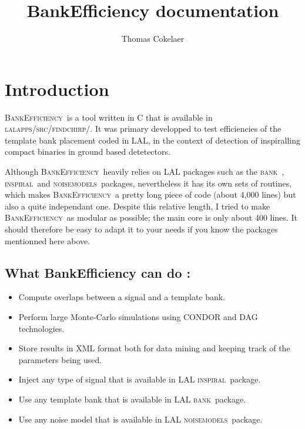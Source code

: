 \documentclass[a4paper,10pt]{article}
\title{BankEfficiency documentation}
\author{Thomas Cokelaer}
\newcommand{\insp}{\textsc{inspiral}~}
\newcommand{\bank}{\textsc{bank}~}
\newcommand{\noise}{\textsc{noisemodels}~}
\newcommand{\be}{\textsc{BankEfficiency}~}
\begin{document}

\pagestyle{plain}
\rfoot{}
\lfoot{}
\pagestyle{plain}


\noindent
\maketitle

\setcounter{tocdepth}{1}
\tableofcontents
\section{Introduction}
\be is a tool written in C that is available in \textsc{lalapps/src/findchirp/}. It was primary developped to test efficiencies of the template bank placement coded in LAL, in the context of detection of inspiralling compact binaries in ground based detetectors. 

Although \be heavily relies on LAL packages such as the \bank, \insp and \noise packages, nevertheless it has its own sets of routines, which makes \be a pretty long piece of code (about 4,000 lines) but also a quite independant one.  Despite this relative length, I tried to make \be as modular as possible; the main core is only about 400 lines. It should therefore be easy to adapt it to your needs if you know the packages mentionned here above. 

\subsection*{What BankEfficiency can do :}
\begin{itemize}
 \item Compute overlaps between a signal and a template bank.
 \item Perform large Monte-Carlo simulations using \textsc{CONDOR} and \textsc{DAG} technologies.
 \item Store results in XML format both for data mining and keeping track of the parameters being used.
 \item Inject any type of signal that is available in LAL \insp package.
 \item Use any template bank that is available in LAL \bank package.
 \item Use any noise model that is available in LAL \noise package.
\end{itemize}
\end{document}
